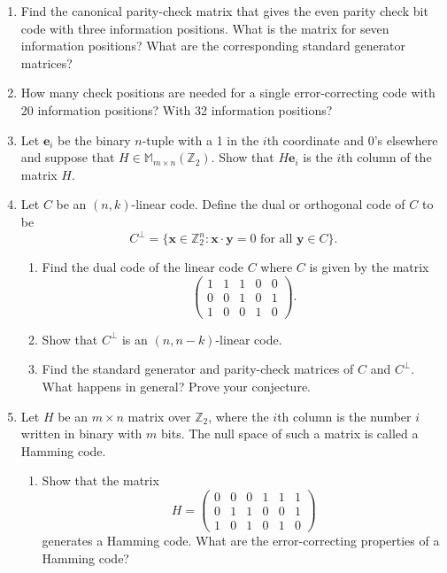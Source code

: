 {\begin{enumerate}
 
\item
Find the canonical parity-check matrix that gives the even
parity check bit code with three information positions. What is the
matrix for seven information positions?  What are the corresponding
standard generator matrices? 
 
 
\item
How many check positions are needed for a single error-correcting code
with 20 information positions? With 32 information positions?
 
 
 
\item
Let ${\mathbf e}_i$ be the binary $n$-tuple with a 1 in the $i$th
coordinate and $0$'s elsewhere and suppose that $H \in {\mathbb M}_{m
\times n}({\mathbb Z}_2)$. Show that $H{\mathbf e}_i$ is the $i$th
column of the matrix $H$. 
 
 
\item
Let $C$ be an $(n,k)$-linear code. Define the {\bfi
dual\/} or {\bfi orthogonal code\/} of $C$  to be 
\[
C^\perp = \{ {\mathbf x} \in {\mathbb Z}_2^n :  {\mathbf x} \cdot {\mathbf y} =
0 \mbox{ for all } {\mathbf y} \in C \}. 
\]
\begin{enumerate}
 
 \item
Find the dual code of the linear code $C$ where $C$ is given by the
matrix 
\[
\begin{pmatrix}
1 & 1 & 1 & 0 & 0 \\
0 & 0 & 1 & 0 & 1 \\
1 & 0 & 0 & 1 & 0
\end{pmatrix}.
\]
 
 \item
Show that $C^\perp$ is an $(n, n-k)$-linear code.
 
 \item
Find the standard generator and parity-check matrices of $C$ and
$C^\perp$. What happens in general? Prove your conjecture. 
 
\end{enumerate}
 
 
\item
Let $H$ be an $m \times n$ matrix over ${\mathbb Z}_2$, where the $i$th
column is the number $i$ written in binary with $m$ bits. The null
space of such a matrix is called a {\bfi Hamming
code}. 
\begin{enumerate}
 
 \item
Show  that the matrix
\[
H =
\begin{pmatrix}
0 & 0 & 0 & 1 & 1 & 1 \\
0 & 1 & 1 & 0 & 0 & 1 \\
1 & 0 & 1 & 0 & 1 & 0
\end{pmatrix}
\]
generates a Hamming code. What are the error-correcting properties of
a Hamming code? 
 

\end{enumerate}
\end{enumerate}}
